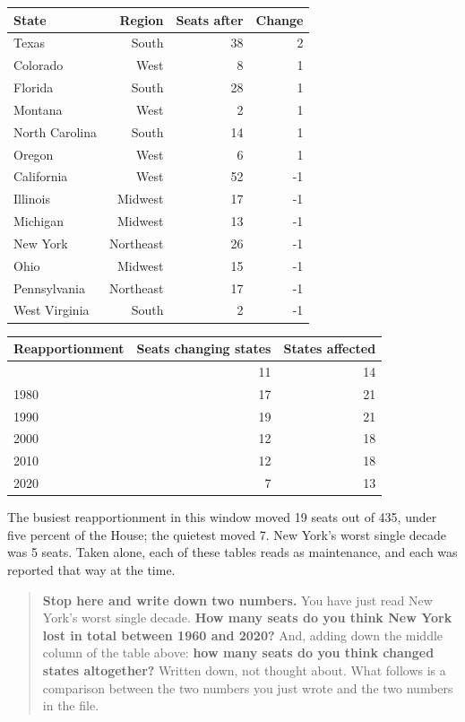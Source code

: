 \documentclass[
]{article}
\newcounter{none} %
\begin{document}
{\def\LTcaptype{none} %
\begin{longtable}[]{@{}lrrr@{}}
\toprule\noalign{}
State & Region & Seats after & Change \\
\midrule\noalign{}
\endhead
\bottomrule\noalign{}
\endlastfoot
Texas & South & 38 & 2 \\
Colorado & West & 8 & 1 \\
Florida & South & 28 & 1 \\
Montana & West & 2 & 1 \\
North Carolina & South & 14 & 1 \\
Oregon & West & 6 & 1 \\
California & West & 52 & -1 \\
Illinois & Midwest & 17 & -1 \\
Michigan & Midwest & 13 & -1 \\
New York & Northeast & 26 & -1 \\
Ohio & Midwest & 15 & -1 \\
Pennsylvania & Northeast & 17 & -1 \\
West Virginia & South & 2 & -1 \\
\end{longtable}
}

{\def\LTcaptype{none} %
\begin{longtable}[]{@{}lrr@{}}
\toprule\noalign{}
Reapportionment & Seats changing states & States affected \\
\midrule\noalign{}
\endhead
\bottomrule\noalign{}
\endlastfoot
1970 & 11 & 14 \\
1980 & 17 & 21 \\
1990 & 19 & 21 \\
2000 & 12 & 18 \\
2010 & 12 & 18 \\
2020 & 7 & 13 \\
\end{longtable}
}

The busiest reapportionment in this window moved 19 seats out of 435,
under five percent of the House; the quietest moved 7. New York's worst
single decade was 5 seats. Taken alone, each of these tables reads as
maintenance, and each was reported that way at the time.

\begin{quote}
\textbf{Stop here and write down two numbers.} You have just read New
York's worst single decade. \textbf{How many seats do you think New York
lost in total between 1960 and 2020?} And, adding down the middle column
of the table above: \textbf{how many seats do you think changed states
altogether?} Written down, not thought about. What follows is a
comparison between the two numbers you just wrote and the two numbers in
the file.
\end{quote}
\end{document}
